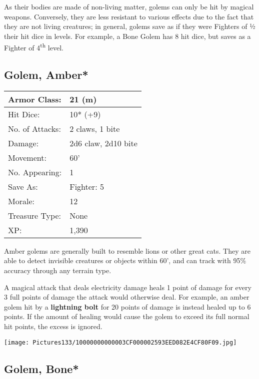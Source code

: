 \documentclass[a4paper,twoside,openany,10pt]{book}
\begin{document}
\begin{multicols}{2}
As their bodies are made of non-living matter, golems can only be hit by magical weapons. Conversely, they are less resistant to various effects due to the fact that they are not living creatures; in general, golems save as if they were Fighters of ½ their hit dice in levels. For example, a Bone Golem has 8 hit dice, but saves as a Fighter of 4\textsuperscript{th} level.

\subsection*{Golem, Amber*}\label{golem-amber}

\begin{tabularx}{0.48\textwidth}{@{}lX@{}}
Armor Class: & 21 (m) \\\hline
Hit Dice: & 10* (+9) \\\hline
No. of Attacks: & 2 claws, 1 bite \\\hline
Damage: & 2d6 claw, 2d10 bite \\\hline
Movement: & 60' \\\hline
No. Appearing: & 1 \\\hline
Save As: & Fighter: 5 \\\hline
Morale: & 12 \\\hline
Treasure Type: & None \\\hline
XP: & 1,390 \\\hline
\end{tabularx}\medskip



Amber golems are generally built to resemble lions or other great cats. They are able to detect invisible creatures or objects within 60', and can track with 95\% accuracy through any terrain type.

A magical attack that deals electricity damage heals 1 point of damage for every 3 full points of damage the attack would otherwise deal. For example, an amber golem hit by a \textbf{lightning bolt} for 20 points of damage is instead healed up to 6 points. If the amount of healing would cause the golem to exceed its full normal hit points, the excess is ignored.


\begin{center}
	\texttt{[image: Pictures133/10000000000003CF000002593EED082E4CF80F09.jpg]}
\end{center}

\columnbreak


\subsection*{Golem, Bone*}\label{golem-bone}



\end{multicols}
\end{document}
